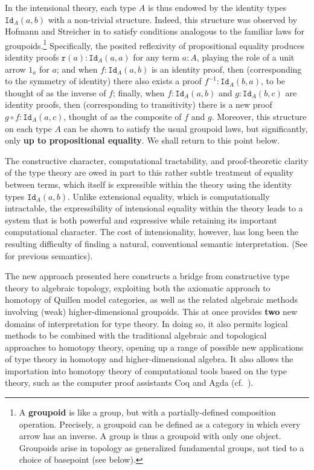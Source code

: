\documentclass[reqno,12pt]{amsart}
\newcommand{\myemph}[1]{\textbf{#1}}    %
\newcommand{\id}[1]{\texttt{Id}_{#1}}
\theoremstyle{definition}
\theoremstyle{remark}
\begin{document}
In the intensional theory, each type $A$ is thus endowed by the identity types $\id{A}(a,b)$ with a non-trivial structure.  Indeed, this structure was observed by Hofmann and Streicher in \cite{Hofmann:GITT} to satisfy conditions analogous to the familiar laws for groupoids.\footnote{%
A \myemph{groupoid} is like a group, but with a partially-defined composition operation.  Precisely, a groupoid can be defined as a category in which every arrow has an inverse.  A group is thus a groupoid with only one object.  Groupoids arise in topology as generalized fundamental groups, not tied to a choice of basepoint (see below).}
  Specifically, the posited reflexivity of propositional equality produces identity proofs $\mathtt{r}(a):\id{A}(a,a)$\/ for any term $a:A$, playing the role of a unit arrow $1_a$ for $a$; and when $f:\id{A}(a,b)$\/ is an identity proof, then (corresponding to the symmetry of identity) there also exists a proof $f^{-1}:\id{A}(b,a)$, to be thought of as the inverse of $f$; finally, when $f:\id{A}(a,b)$\/ and $g:\id{A}(b,c)$\/ are identity proofs, then (corresponding to transitivity) there is a new proof $g \circ f:\id{A}(a,c)$, thought of as the composite of $f$\/ and $g$. Moreover, this structure on each type $A$ can be shown to satisfy the usual groupoid laws, but significantly,  only \myemph{up to propositional equality}.  We shall return to this point below.

The constructive character, computational tractability, and proof-theoretic clarity of the type theory are owed in part to this rather subtle treatment of equality between terms, which itself is expressible within the theory using the identity types $\id{A}(a,b)$.  Unlike extensional equality, which is computationally intractable, the expressibility of intensional equality within the theory leads to a system that is both powerful and expressive while retaining its important computational character.  The cost of intensionality, however, has long been the resulting difficulty of finding a natural, conventional semantic interpretation.  (See \cite{Hofmann:SSDT,cartmell:generalised-algebraic-theories,Hofmann:OITTLCCC,Dybjer:ITT} for previous semantics).

The new approach presented here constructs a bridge from constructive type theory to algebraic topology, exploiting both the axiomatic approach to homotopy of Quillen model categories, as well as the related algebraic methods involving (weak) higher-dimensional groupoids.  This at once provides \myemph{two} new domains of interpretation for type theory.  In doing so, it also permits logical methods to be combined with the traditional algebraic and topological approaches to homotopy theory, opening up a range of possible new applications of type theory in homotopy and higher-dimensional algebra.  It also allows the importation into homotopy theory of computational tools based on the type theory, such as the computer proof assistants Coq and Agda (cf.~\cite{Thery:C}).
\end{document}
